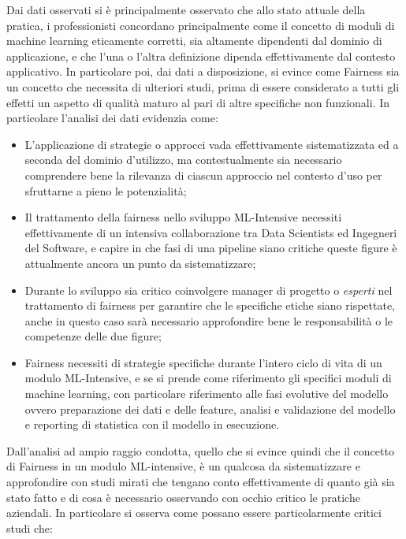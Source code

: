     Dai dati osservati si è principalmente osservato che allo stato attuale della  pratica, i professionisti concordano principalmente come il concetto di moduli di machine learning eticamente corretti, sia altamente dipendenti dal dominio di applicazione, e che l'una o l'altra definizione dipenda effettivamente dal contesto applicativo. In particolare poi, dai dati a disposizione, si evince come Fairness sia un concetto che necessita di ulteriori studi, prima di essere considerato a tutti gli effetti un aspetto di qualità maturo al pari di altre specifiche non funzionali. In particolare l'analisi dei dati evidenzia come:
    
    \begin{itemize}
        \item L'applicazione di strategie o approcci vada effettivamente sistematizzata ed a seconda del dominio d'utilizzo, ma contestualmente sia necessario comprendere bene la rilevanza di ciascun approccio nel contesto d'uso per sfruttarne a pieno le potenzialità;
        \item Il trattamento della fairness nello sviluppo ML-Intensive necessiti effettivamente di un intensiva collaborazione tra Data Scientists ed Ingegneri del Software, e capire in che fasi di una pipeline siano critiche queste figure è attualmente ancora un punto da sistematizzare;
        \item Durante lo sviluppo sia critico coinvolgere manager di progetto o \emph{esperti} nel trattamento di fairness per garantire che le specifiche etiche siano rispettate, anche in questo caso sarà necessario approfondire bene le responsabilità o le competenze delle due figure;
        \item Fairness necessiti di strategie specifiche durante l'intero ciclo di vita di un modulo ML-Intensive, e se si prende come riferimento gli specifici moduli di machine learning, con particolare riferimento alle fasi evolutive del modello ovvero preparazione dei dati e delle feature, analisi e validazione del modello e reporting di statistica con il modello in esecuzione.
    \end{itemize}


    Dall'analisi ad ampio raggio condotta, quello che si evince quindi che il concetto di Fairness in un modulo ML-intensive, è un qualcosa da sistematizzare e approfondire con studi mirati che tengano conto effettivamente di quanto già sia stato fatto e di cosa è necessario osservando con occhio critico le pratiche aziendali. In particolare si osserva come possano essere particolarmente critici studi che:
    
